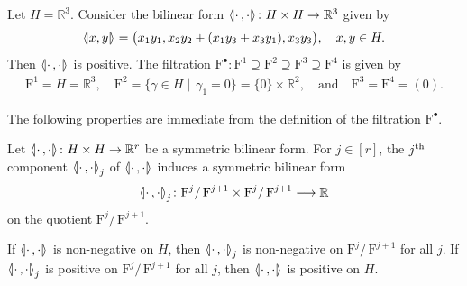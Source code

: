 \documentclass[AHL,Unicode,longabstracts]{cedram}
\newcommand{\llangle}{\mathopen{\langle\mkern -3.1mu\lvert}}
\newcommand{\rrangle}{\mathclose{\rvert\mkern -3.1mu\rangle}}
\newcommand{\highinn}[2]{{\llangle#2\rrangle_{#1}}}
\newcommand{\rquot}[2]{#1/\,#2}
\newcommand{\filter}{\mathrm{F}}
\newcommand{\R}{\mathbb{R}}
\renewcommand*{\to}{\mathchoice{\longrightarrow}{\rightarrow}{\rightarrow}{\rightarrow}}
\begin{document}
\begin{exam}\label{ex:PositiveButNotInner}
Let $H = \R^3$. Consider the bilinear form $\highinn{}{\cdot \,, \cdot} \colon H \times H \to \R^3$ given by
\[
\highinn{}{x, y} = \bigl(x_1 y_1, x_2 y_2 + (x_1y_3 + x_3 y_1), x_3 y_3 \bigr), \quad x,y \in H.
\]
Then $\highinn{}{\cdot \,, \cdot}$ is positive. The filtration $\filter^\bullet \colon \filter^1 \supseteq \filter^2 \supseteq \filter^3 \supseteq \filter^{4}$ is given by
\begin{align*}
\filter^1 = H = \R^3, \quad \filter^2 = \{ \gamma \in H \mid \, \gamma_1 = 0 \} = \{0\} \times \R^2, \quad \text{and} \quad \filter^3 = \filter^4 = (0).%
\end{align*}
\end{exam}

The following properties are immediate from the definition of the filtration $\filter^\bullet$.

\begin{prop}\label{prop:GradedForms}
Let $\highinn{}{\cdot \,, \cdot} \colon H \times H \to \R^r$ be a symmetric bilinear form. For $j \in [r]$, the $j^{\rm th}$ component $\highinn{j}{\cdot \,, \cdot}$ of $\highinn{}{\cdot \,, \cdot}$ induces a symmetric bilinear form
\[
\highinn{j}{\cdot\,, \cdot} \colon \rquot{\filter^j}{\filter^{j+1}} \times \rquot{\filter^j}{\filter^{j+1}} \to \R
\]
on the quotient $\rquot{\filter^j}{\filter^{j+1}}$.

If $\highinn{}{\cdot \,, \cdot}$ is non-negative on $H$, then $\highinn{j}{\cdot \,, \cdot}$ is non-negative on $\rquot{\filter^j}{\filter^{j+1}}$ for all $j$. If $\highinn{j}{\cdot \,, \cdot}$ is positive on $\rquot{\filter^j}{\filter^{j+1}}$ for all $j$, then $\highinn{}{\cdot \,, \cdot}$ is positive on $H$.
\end{prop}
\end{document}
